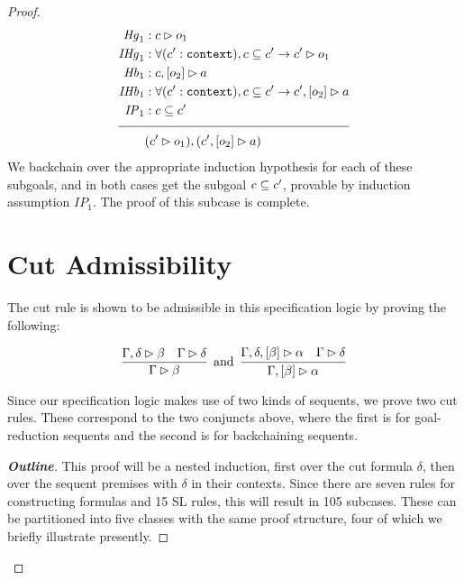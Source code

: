 \begin{proof}
\begin{align*}
\mathit{Hg}_1 &: \seqsl[c]{o_1} \\
\mathit{IHg}_1 &: \forall (\inddyncon{} : \sltm{context}), c \subseteq \inddyncon{} \rightarrow \seqsl[\inddyncon{}]{o_1} \\
\mathit{Hb}_1 &: \bchsl[c]{o_2}{a} \\
\mathit{IHb}_1 &: \forall (\inddyncon{} : \sltm{context}), c \subseteq \inddyncon{} \rightarrow \bchsl[\inddyncon{}]{o_2}{a} \\
\mathit{IP}_1 &: c \subseteq \inddyncon{} \\[\pfshift{}]
\cline{1-2}
& (\seqsl[\inddyncon{}]{o_1}), (\bchsl[\inddyncon{}]{o_2}{a})
\end{align*}
We backchain over the appropriate induction hypothesis for each of these subgoals, and in both cases get the subgoal $c \subseteq c'{}$, provable by induction assumption $\mathit{IP}_1$. The proof of this subcase is complete.


\section{Cut Admissibility}
\label{sec:cutadmisssl}

The cut rule is shown to be admissible in this specification logic by proving the following:

\begin{theorem}
\label{thm:cut_admissible}
$$
\vcenter{\infer{\seqsl[\dyncon{}]{\beta}}{\seqsl[\dyncon{} , \delta]{\beta} & \seqsl[\dyncon{}]{\delta}}}
\;\; \mathrm{and} \;\;
\vcenter{\infer{\bchsl[\dyncon{}]{\beta}{\alpha}}{\bchsl[\dyncon{} , \delta]{\beta}{\alpha} & \seqsl[\dyncon{}]{\delta}}}
$$
\end{theorem}
\noindent Since our specification logic makes use of two kinds of sequents, we prove two cut rules. These correspond to the two conjuncts above, where the first is for goal-reduction sequents and the second is for backchaining sequents. \\

\begin{proof}[\textbf{Outline}]

This proof will be a nested induction, first over the cut formula $\delta$, then over the sequent premises with $\delta$ in their contexts. Since there are seven rules for constructing formulas and 15 SL rules, this will result in 105 subcases. These can be partitioned into five classes with the same proof structure, four of which we briefly illustrate presently.


\end{proof}
\end{proof}

